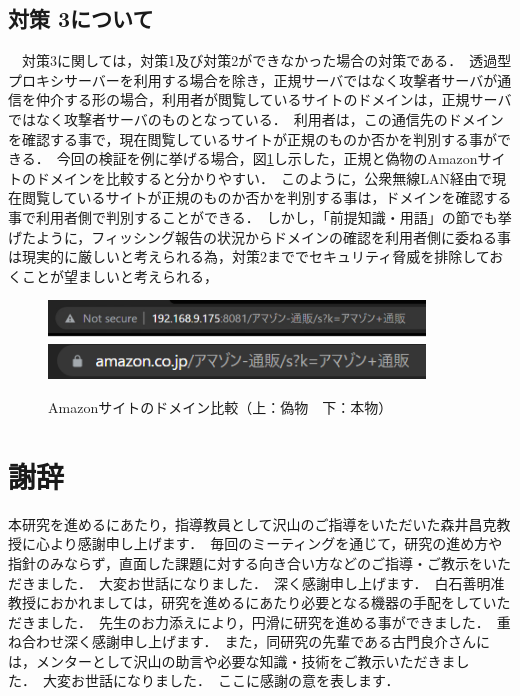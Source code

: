 \documentclass[dvipdfmx]{jsarticle}
\begin{document}
            \subsection{対策 3について}
                　対策3に関しては，対策1及び対策2ができなかった場合の対策である．\
                透過型プロキシサーバーを利用する場合を除き，正規サーバではなく攻撃者サーバが通信を仲介する形の場合，利用者が閲覧しているサイトのドメインは，正規サーバではなく攻撃者サーバのものとなっている．\
                利用者は，この通信先のドメインを確認する事で，現在閲覧しているサイトが正規のものか否かを判別する事ができる．\
                今回の検証を例に挙げる場合，図\ref{compare-amazon-domain}し示した，正規と偽物のAmazonサイトのドメインを比較すると分かりやすい．\
                このように，公衆無線LAN経由で現在閲覧しているサイトが正規のものか否かを判別する事は，ドメインを確認する事で利用者側で判別することができる．\
                しかし，「前提知識・用語」の節でも挙げたように，フィッシング報告の状況からドメインの確認を利用者側に委ねる事は現実的に厳しいと考えられる為，対策2まででセキュリティ脅威を排除しておくことが望ましいと考えられる，\
                \begin{figure}[pth]
                    \centering
                    \includegraphics[width=10cm]{img/measure-domain-00.png}
                    \includegraphics[width=10cm]{img/measure-domain-01.png}
                    \caption{Amazonサイトのドメイン比較（上：偽物　下：本物）}
                    \label{compare-amazon-domain}
                \end{figure}
        \section{謝辞}
            本研究を進めるにあたり，指導教員として沢山のご指導をいただいた森井昌克教授に心より感謝申し上げます．\
            毎回のミーティングを通じて，研究の進め方や指針のみならず，直面した課題に対する向き合い方などのご指導・ご教示をいただきました．\
            大変お世話になりました．\
            深く感謝申し上げます．\
            白石善明准教授におかれましては，研究を進めるにあたり必要となる機器の手配をしていただきました．\
            先生のお力添えにより，円滑に研究を進める事ができました．\
            重ね合わせ深く感謝申し上げます．\
            また，同研究の先輩である古門良介さんには，メンターとして沢山の助言や必要な知識・技術をご教示いただきました．\
            大変お世話になりました．\
            ここに感謝の意を表します．\
\end{document}
